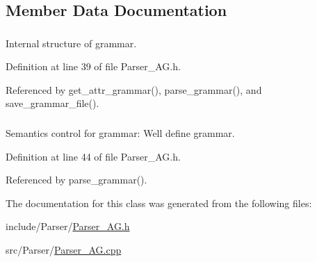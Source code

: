 \subsection{Member Data Documentation}
\hypertarget{classgenevalmag_1_1Parser__AG_af806906189d19d98132d94b2fdf4a7d1}{
\subsubsection[{attr\_\-grammar}]{}}
\label{classgenevalmag_1_1Parser__AG_af806906189d19d98132d94b2fdf4a7d1}


Internal structure of grammar. 



Definition at line 39 of file Parser\_\-AG.h.



Referenced by get\_\-attr\_\-grammar(), parse\_\-grammar(), and save\_\-grammar\_\-file().

\hypertarget{classgenevalmag_1_1Parser__AG_a0ae8c86d8db3e9e354377588754559fe}{
\subsubsection[{sem\_\-check}]{}}
\label{classgenevalmag_1_1Parser__AG_a0ae8c86d8db3e9e354377588754559fe}


Semantics control for grammar: Well define grammar. 



Definition at line 44 of file Parser\_\-AG.h.



Referenced by parse\_\-grammar().



The documentation for this class was generated from the following files:\begin{DoxyCompactItemize}
\item 
include/Parser/\hyperlink{Parser__AG_8h}{Parser\_\-AG.h}\item 
src/Parser/\hyperlink{Parser__AG_8cpp}{Parser\_\-AG.cpp}\end{DoxyCompactItemize}
